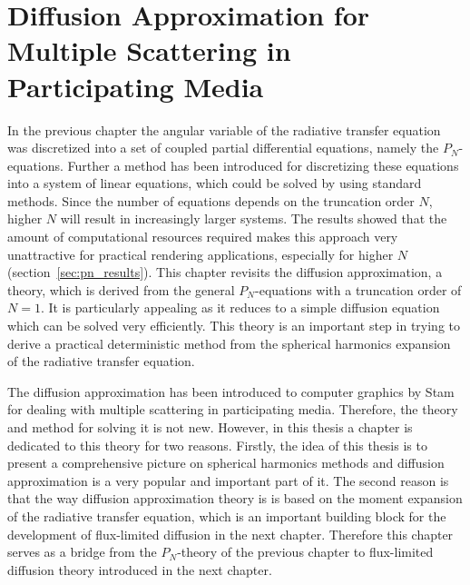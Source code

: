 \chapter{Diffusion Approximation for Multiple Scattering in Participating Media}
%
\label{sec:diffusion_approximation}

In the previous chapter the angular variable of the radiative transfer equation was discretized into a set of coupled partial differential equations, namely the $P_N$-equations. Further a method has been introduced for discretizing these equations into a system of linear equations, which could be solved by using standard methods. Since the number of equations depends on the truncation order $N$, higher $N$ will result in increasingly larger systems. The results showed that the amount of computational resources required makes this approach very unattractive for practical rendering applications, especially for higher $N$ (section~\ref{sec:pn_results}). This chapter revisits the diffusion approximation, a theory, which is derived from the general $P_N$-equations with a truncation order of $N=1$. It is particularly appealing as it reduces to a simple diffusion equation which can be solved very efficiently. This theory is an important step in trying to derive a practical deterministic method from the spherical harmonics expansion of the radiative transfer equation.

The diffusion approximation has been introduced to computer graphics by Stam~\cite{Stam95} for dealing with multiple scattering in participating media. Therefore, the theory and method for solving it is not new. However, in this thesis a chapter is dedicated to this theory for two reasons. Firstly, the idea of this thesis is to present a comprehensive picture on spherical harmonics methods and diffusion approximation is a very popular and important part of it. The second reason is that the way diffusion approximation theory is is based on the moment expansion of the radiative transfer equation, which is an important building block for the development of flux-limited diffusion in the next chapter. Therefore this chapter serves as a bridge from the $P_N$-theory of the previous chapter to flux-limited diffusion theory introduced in the next chapter.


